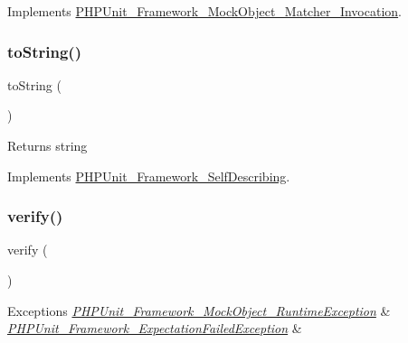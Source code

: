 Implements \mbox{\hyperlink{interface_p_h_p_unit___framework___mock_object___matcher___invocation_a4988c6fa11e275302172d0a4ae32dd3a}{P\+H\+P\+Unit\+\_\+\+Framework\+\_\+\+Mock\+Object\+\_\+\+Matcher\+\_\+\+Invocation}}.

\mbox{\label{class_p_h_p_unit___framework___mock_object___matcher_a5558c5d549f41597377fa1ea8a1cefa3}} 
\subsubsection{\texorpdfstring{to\+String()}{toString()}}
{\footnotesize\ttfamily to\+String (\begin{DoxyParamCaption}{ }\end{DoxyParamCaption})}

\begin{DoxyReturn}{Returns}
string 
\end{DoxyReturn}


Implements \mbox{\hyperlink{interface_p_h_p_unit___framework___self_describing_a5558c5d549f41597377fa1ea8a1cefa3}{P\+H\+P\+Unit\+\_\+\+Framework\+\_\+\+Self\+Describing}}.

\mbox{\label{class_p_h_p_unit___framework___mock_object___matcher_aa33600b6a1b28d0c4dfe4d468272aaa4}} 
\subsubsection{\texorpdfstring{verify()}{verify()}}
{\footnotesize\ttfamily verify (\begin{DoxyParamCaption}{ }\end{DoxyParamCaption})}


\begin{DoxyExceptions}{Exceptions}
{\em \mbox{\hyperlink{class_p_h_p_unit___framework___mock_object___runtime_exception}{P\+H\+P\+Unit\+\_\+\+Framework\+\_\+\+Mock\+Object\+\_\+\+Runtime\+Exception}}} & \\
\hline
{\em \mbox{\hyperlink{class_p_h_p_unit___framework___expectation_failed_exception}{P\+H\+P\+Unit\+\_\+\+Framework\+\_\+\+Expectation\+Failed\+Exception}}} & \\
\hline
\end{DoxyExceptions}


